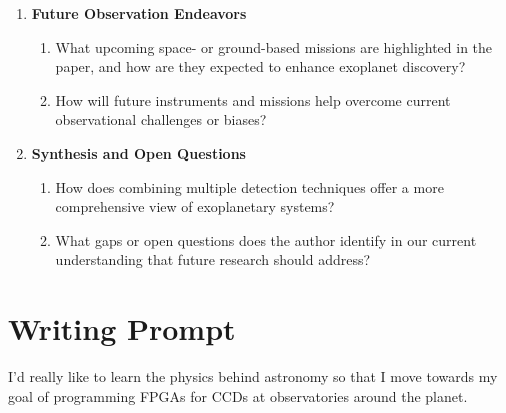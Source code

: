 \documentclass[floatfix, aps]{revtex4-2}
\begin{document}
\begin{enumerate}[label=\arabic*.]
	\item \textbf{Future Observation Endeavors}
	\begin{enumerate}[label*=\arabic*.]
		\item What upcoming space- or ground-based missions are highlighted in the paper, and how are they expected to enhance exoplanet discovery?
		\item How will future instruments and missions help overcome current observational challenges or biases?
	\end{enumerate}
	
	\item \textbf{Synthesis and Open Questions}
	\begin{enumerate}[label*=\arabic*.]
		\item How does combining multiple detection techniques offer a more comprehensive view of exoplanetary systems?
		\item What gaps or open questions does the author identify in our current understanding that future research should address?
	\end{enumerate}
	
\end{enumerate}

\section{Writing Prompt}

I'd really like to learn the physics behind astronomy so that I move towards my goal of programming FPGAs for CCDs at observatories around the planet. 
\end{document}
